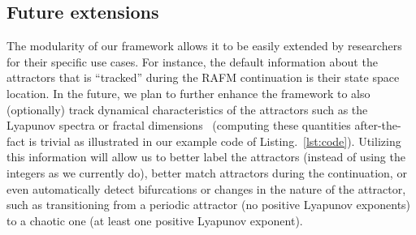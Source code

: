 \documentclass[9pt,twocolumn,twoside,lineno]{pnas-new}
\begin{document}
\subsection{Future extensions}
The modularity of our framework allows it to be easily extended by researchers for their specific use cases. For instance, the default information about the attractors that is ``tracked'' during the RAFM continuation is their state space location. In the future, we plan to further enhance the framework to also (optionally) track dynamical characteristics of the attractors such as the Lyapunov spectra or fractal dimensions~\cite{DatserisBook} (computing these quantities after-the-fact is trivial as illustrated in our example code of Listing.~\ref{lst:code}). Utilizing this information will allow us to better label the attractors (instead of using the integers as we currently do), better match attractors during the continuation, or even automatically detect bifurcations or changes in the nature of the attractor, such as transitioning from a periodic attractor (no positive Lyapunov exponents) to a chaotic one (at least one positive Lyapunov exponent).
\end{document}
